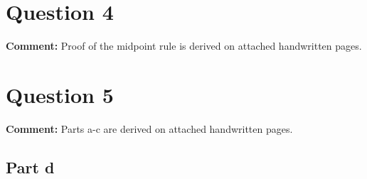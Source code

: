 \documentclass[10pt]{article}
\begin{document}
\section{Question 4}
\textbf{Comment:} Proof of the midpoint rule is derived on attached handwritten pages.
\section{Question 5}
\textbf{Comment:} Parts a-c are derived on attached handwritten pages.

\subsection{Part d}
\end{document}
